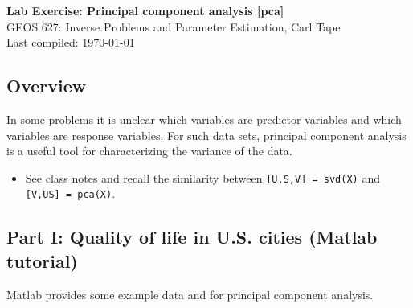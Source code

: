 \documentclass[11pt,titlepage,fleqn]{article}
\begin{document}

\begin{spacing}{1.2}
\centering
{\large \bf Lab Exercise: Principal component analysis [pca]} \\
GEOS 627: Inverse Problems and Parameter Estimation, Carl Tape \\
Last compiled: \today
\end{spacing}


\subsection*{Overview}

In some problems it is unclear which variables are predictor variables and which variables are response variables. For such data sets, principal component analysis is a useful tool for characterizing the variance of the data.

\begin{itemize}
\item See class notes and recall the similarity between \verb+[U,S,V] = svd(X)+ and \verb+[V,US] = pca(X)+.


\end{itemize}


\subsection*{Part I: Quality of life in U.S. cities (Matlab tutorial)}

Matlab provides some example data and for principal component analysis.
\end{document}
